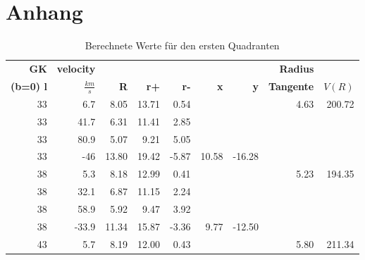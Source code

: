 

\newpage
\listoffigures
\listoftables
{}
\section*{Anhang}
\setcounter{section}{6}
\newpage
\begin{table}[H]
    \centering
    \caption{Berechnete Werte für den ersten Quadranten}
\begin{tabular}{|r|r|r|r|r|r|r|r|r|}
\hline
    {\textbf{GK}} & {\textbf{velocity}} & {} &   {} &   {} &    {} &    {} & {\textbf{Radius}} & {} \\
    {\textbf{(b=0) l}} & {\textbf{$\si{}{\frac{km}{s}}$}}& {\textbf{R}} &   {\textbf{r+}} &   {\textbf{r-}} &    {\textbf{x} }&    {\textbf{y}} & {\textbf{Tangente}} & {\textbf{$V(R)$}} \\
    \hline
            33 &        6.7 &       8.05 &      13.71 &       0.54 &            &            &       4.63 &     200.72 \\
    
            33 &       41.7 &       6.31 &      11.41 &       2.85 &            &            &            &            \\
    
            33 &       80.9 &       5.07 &       9.21 &       5.05 &            &            &            &            \\
    
            33 &        -46 &      13.80 &      19.42 &      -5.87 &      10.58 &     -16.28 &            &            \\
    \hline
            38 &        5.3 &       8.18 &      12.99 &       0.41 &            &            &       5.23 &     194.35 \\
    
            38 &       32.1 &       6.87 &      11.15 &       2.24 &            &            &            &            \\
    
            38 &       58.9 &       5.92 &       9.47 &       3.92 &            &            &            &            \\
    
            38 &      -33.9 &      11.34 &      15.87 &      -3.36 &       9.77 &     -12.50 &            &            \\
    \hline
            43 &        5.7 &       8.19 &      12.00 &       0.43 &            &            &       5.80 &     211.34 \\
    

\end{tabular}
\end{table}
